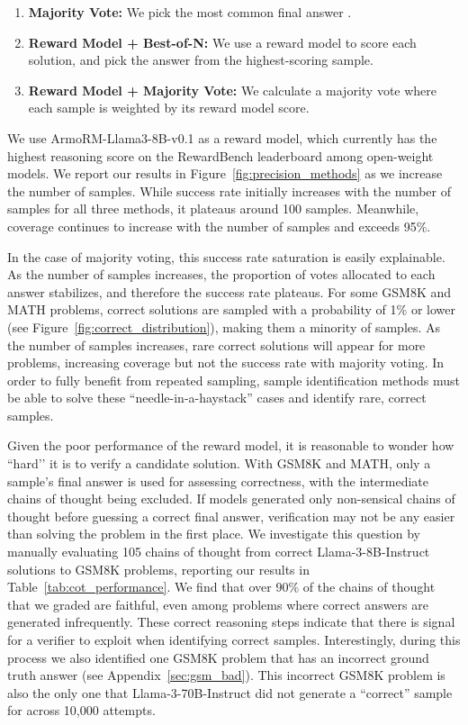 \documentclass[11pt]{article}
\begin{document}
\begin{enumerate}
    \item \textbf{Majority Vote:} We pick the most common final answer \cite{wang2023selfconsistency}.
    \item \textbf{Reward Model + Best-of-N:} We use a reward model \cite{christiano2017deepreinforcementlearninghuman} to score each solution, and pick the answer from the highest-scoring sample.  
    \item \textbf{Reward Model + Majority Vote:} We calculate a majority vote where each sample is weighted by its reward model score.
\end{enumerate}

We use ArmoRM-Llama3-8B-v0.1 \cite{ArmoR} as a reward model, which currently has the highest reasoning score on the RewardBench leaderboard \cite{lambert2024rewardbenchevaluatingrewardmodels} among open-weight models. We report our results in Figure~\ref{fig:precision_methods} as we increase the number of samples. While success rate initially increases with the number of samples for all three methods, it plateaus around 100 samples. Meanwhile, coverage continues to increase with the number of samples and exceeds 95\%.

In the case of majority voting, this success rate saturation is easily explainable. As the number of samples increases, the proportion of votes allocated to each answer stabilizes, and therefore the success rate plateaus. For some GSM8K and MATH problems, correct solutions are sampled with a probability of 1\% or lower (see Figure~\ref{fig:correct_distribution}), making them a minority of samples. As the number of samples increases, rare correct solutions will appear for more problems, increasing coverage but not the success rate with majority voting. In order to fully benefit from repeated sampling, sample identification methods must be able to solve these “needle-in-a-haystack” cases and identify rare, correct samples.

Given the poor performance of the reward model, it is reasonable to wonder how ``hard’’ it is to verify a candidate solution. With GSM8K and MATH, only a sample’s final answer is used for assessing correctness, with the intermediate chains of thought being excluded. If models generated only non-sensical chains of thought before guessing a correct final answer, verification may not be any easier than solving the problem in the first place. We investigate this question by manually evaluating 105 chains of thought from correct Llama-3-8B-Instruct solutions to GSM8K problems, reporting our results in Table~\ref{tab:cot_performance}. 
We find that over 90\% of the chains of thought that we graded are faithful, even among problems where correct answers are generated infrequently.
These correct reasoning steps indicate that there is signal for a verifier to exploit when identifying correct samples. Interestingly, during this process we also identified one GSM8K problem that has an incorrect ground truth answer (see Appendix~\ref{sec:gsm_bad}). 
This incorrect GSM8K problem is also the only one that Llama-3-70B-Instruct did not generate a ``correct'' sample for across 10,000 attempts.
\end{document}
